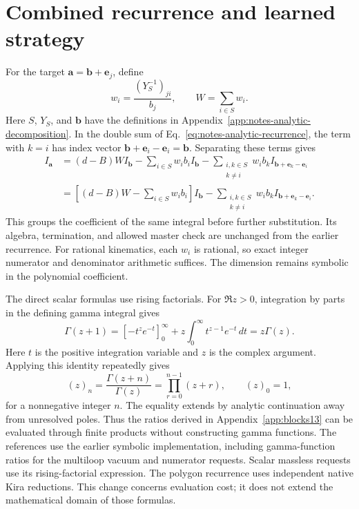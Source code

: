 \section{Combined recurrence and learned strategy}
\label{app:notes-fast-method}
For the target $\boldsymbol a=\boldsymbol b+\boldsymbol e_j$, define
\begin{equation}
 w_i=\frac{(Y_S^{-1})_{ji}}{b_j},\qquad
 W=\sum_{i\in S}w_i.
\end{equation}
Here $S$, $Y_S$, and $\boldsymbol b$ have the definitions in Appendix~\ref{app:notes-analytic-decomposition}. In the double sum of Eq.~\eqref{eq:notes-analytic-recurrence}, the term with $k=i$ has index vector $\boldsymbol b+\boldsymbol e_i-\boldsymbol e_i=\boldsymbol b$. Separating these terms gives
\begin{align}
 I_{\boldsymbol a}
 &= (d-B)W I_{\boldsymbol b}
    -\sum_{i\in S}w_i b_i I_{\boldsymbol b}
    -\sum_{\substack{i,k\in S\\k\ne i}}w_i b_k
       I_{\boldsymbol b+\boldsymbol e_k-\boldsymbol e_i}\\
 &=\left[(d-B)W-\sum_{i\in S}w_i b_i\right]I_{\boldsymbol b}
    -\sum_{\substack{i,k\in S\\k\ne i}}w_i b_k
       I_{\boldsymbol b+\boldsymbol e_k-\boldsymbol e_i}.
 \label{eq:notes-fast-recurrence}
\end{align}
This groups the coefficient of the same integral before further substitution. Its algebra, termination, and allowed master check are unchanged from the earlier recurrence. For rational kinematics, each $w_i$ is rational, so exact integer numerator and denominator arithmetic suffices. The dimension remains symbolic in the polynomial coefficient.

The direct scalar formulas use rising factorials. For $\Re z>0$, integration by parts in the defining gamma integral gives
\begin{equation}
 \Gamma(z+1)=[-t^ze^{-t}]_0^\infty
 +z\int_0^\infty t^{z-1}e^{-t}\,dt=z\Gamma(z).
\end{equation}
Here $t$ is the positive integration variable and $z$ is the complex argument. Applying this identity repeatedly gives
\begin{equation}
 (z)_n=\frac{\Gamma(z+n)}{\Gamma(z)}
      =\prod_{r=0}^{n-1}(z+r),\qquad (z)_0=1,
 \label{eq:notes-fast-product}
\end{equation}
for a nonnegative integer $n$. The equality extends by analytic continuation away from unresolved poles. Thus the ratios derived in Appendix~\ref{app:blocks13} can be evaluated through finite products without constructing gamma functions. The references use the earlier symbolic implementation, including gamma-function ratios for the multiloop vacuum and numerator requests. Scalar massless requests use its rising-factorial expression. The polygon recurrence uses independent native Kira reductions. This change concerns evaluation cost; it does not extend the mathematical domain of those formulas.

